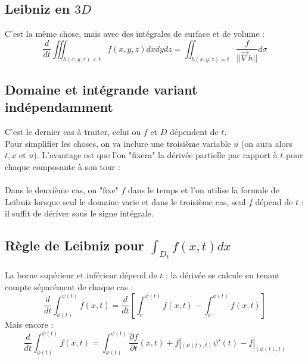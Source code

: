 \documentclass[11pt, a4paper, openany]{book}
\begin{document}
		\subsection{Leibniz en $3D$}
		C'est la même chose, mais avec des intégrales de surface et de volume :
		\begin{equation}
			\frac{d}{dt} \iiint_{h(x,y,z) < t} f(x,y,z)dxdydz = \iint_{h(x,y,z) = t} \frac{f}{||\vec{\nabla}h||}d\sigma
		\end{equation}
									
		\subsection{Domaine et intégrande variant indépendamment}
		C'est le dernier cas à traiter, celui ou $f$ et $D$ dépendent de $t$.\\
		Pour simplifier les choses, on va inclure une troisième variable $u$ (on aura alors $t, x$ et $u$). L'avantage est que l'on "fixera" la dérivée partielle par rapport à $t$ pour chaque composante à son tour :\\
									
		\ \\
									
		Dans le deuxième cas, on "fixe" $f$ dans le temps et l'on utilise la formule de Leibniz lorsque seul le domaine varie et dans le troisième cas, seul $f$ dépend de $t$ : il suffit de dériver sous le signe intégrale.
									
		\subsection{Règle de Leibniz pour $\int_{D_t} f(x,t) dx$}
		La borne supérieur et inférieur dépend de $t$ : la dérivée se calcule en tenant compte séparément de chaque cas :
		\begin{equation}
			\frac{d}{dt}\int_{\phi(t)}^{\psi(t)} f(x,t) =  \frac{d}{dt}\left[\int_c^{\psi(t)}f(x,t) - \int_c^{\phi(t)}f(x,t)\right]
		\end{equation}
		Mais encore :
		\begin{equation}
			\frac{d}{dt}\int_{\phi(t)}^{\psi(t)} f(x,t) = \int_{\phi(t)}^{\psi(t)} \frac{\partial f}{\partial t}(x,t) + f|_{(\psi(t),t)} \psi'(t) - f|_{(\phi(t), t)}
		\end{equation}
									
\end{document}

